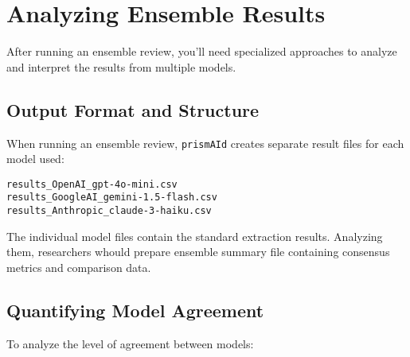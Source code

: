\section{Analyzing Ensemble Results}

After running an ensemble review, you'll need specialized approaches to analyze and interpret the results from multiple models.

\subsection{Output Format and Structure}

When running an ensemble review, \texttt{prismAId} creates separate result files for each model used:

\begin{infobox}
\begin{lstlisting}
results_OpenAI_gpt-4o-mini.csv
results_GoogleAI_gemini-1.5-flash.csv
results_Anthropic_claude-3-haiku.csv
\end{lstlisting}
\end{infobox}

The individual model files contain the standard extraction results. Analyzing them, researchers whould prepare ensemble summary file containing consensus metrics and comparison data.

\subsection{Quantifying Model Agreement}

To analyze the level of agreement between models:


